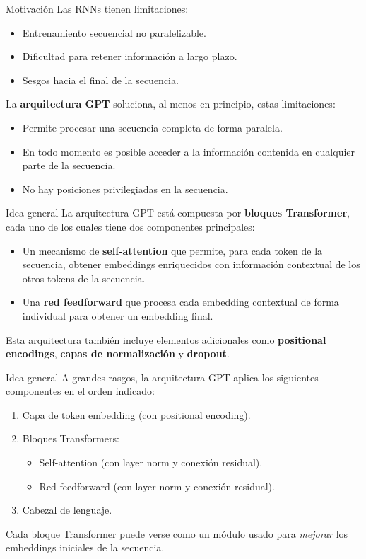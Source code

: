 \documentclass{beamer}
\begin{document}
\begin{frame}{Motivación}
    Las RNNs tienen limitaciones:
    \begin{itemize}
        \item Entrenamiento secuencial no paralelizable.
        \item Dificultad para retener información a largo plazo.
        \item Sesgos hacia el final de la secuencia.
    \end{itemize}
    La \textbf{arquitectura GPT} soluciona, al menos en principio, estas limitaciones:
    \begin{itemize}
        \item Permite procesar una secuencia completa de forma paralela.
        \item En todo momento es posible acceder a la información contenida en cualquier parte de la secuencia.
        \item No hay posiciones privilegiadas en la secuencia.
    \end{itemize}
\end{frame}

\begin{frame}{Idea general}
    La arquitectura GPT está compuesta por \textbf{bloques Transformer}, cada uno de los cuales tiene dos componentes principales:
    \begin{itemize}
        \item Un mecanismo de \textbf{self-attention} que permite, para cada token de la secuencia, obtener embeddings enriquecidos con información contextual de los otros tokens de la secuencia.
        \item Una \textbf{red feedforward} que procesa cada embedding contextual de forma individual para obtener un embedding final.
    \end{itemize}
    Esta arquitectura también incluye elementos adicionales como \textbf{positional encodings}, \textbf{capas de normalización} y \textbf{dropout}.
\end{frame}

\begin{frame}{Idea general}
    A grandes rasgos, la arquitectura GPT aplica los siguientes componentes en el orden indicado:
    \begin{enumerate}
        \item Capa de token embedding (con positional encoding).
        \item Bloques Transformers:
              \begin{itemize}
                  \item Self-attention (con layer norm y conexión residual).
                  \item Red feedforward (con layer norm y conexión residual).
              \end{itemize}
        \item Cabezal de lenguaje.
    \end{enumerate}
    Cada bloque Transformer puede verse como un módulo usado para \textit{mejorar} los embeddings iniciales de la secuencia.
\end{frame}
\end{document}
